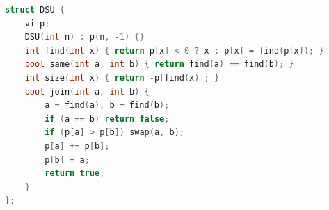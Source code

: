 \begin{lstlisting}[language=C++]
struct DSU {
	vi p;
	DSU(int n) : p(n, -1) {}
	int find(int x) { return p[x] < 0 ? x : p[x] = find(p[x]); }
	bool same(int a, int b) { return find(a) == find(b); }
	int size(int x) { return -p[find(x)]; }
	bool join(int a, int b) {
		a = find(a), b = find(b);
		if (a == b) return false;
		if (p[a] > p[b]) swap(a, b);
		p[a] += p[b];
		p[b] = a;
		return true;
	}
};
\end{lstlisting}
